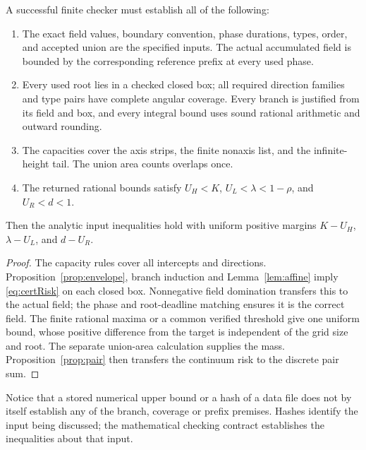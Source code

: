 \begin{proposition}\label{prop:contract}
A successful finite checker must establish all of the following:
\begin{enumerate}
\item The exact field values, boundary convention, phase durations,
types, order, and accepted union are the specified inputs.
The actual accumulated field is bounded by the corresponding
reference prefix at every used phase.
\item Every used root lies in a checked closed box; all required
direction families and type pairs have complete angular coverage.
Every branch is justified from its field and box, and every integral
bound uses sound rational arithmetic and outward rounding.
\item The capacities cover the axis strips, the finite nonaxis list,
and the infinite-height tail. The union area counts overlaps once.
\item The returned rational bounds satisfy
\(U_H<K\), \(U_L<\lambda<1-\rho\), and \(U_R<d<1\).
\end{enumerate}
Then the analytic input inequalities hold with uniform positive
margins \(K-U_H\), \(\lambda-U_L\), and \(d-U_R\).
\end{proposition}
\begin{proof}
The capacity rules cover all intercepts and directions.
Proposition~\ref{prop:envelope}, branch induction and
Lemma~\ref{lem:affine} imply \eqref{eq:certRisk} on each closed box.
Nonnegative field domination transfers this to the actual field;
the phase and root-deadline matching ensures it is the correct
field. The finite rational maxima or a common verified threshold
give one uniform bound, whose positive difference from the target
is independent of the grid size and root. The separate union-area
calculation supplies the mass. Proposition~\ref{prop:pair} then
transfers the continuum risk to the discrete pair sum.
\end{proof}

Notice that a stored numerical upper bound or a hash of a data file
does not by itself establish any of the branch, coverage or prefix
premises. Hashes identify the input being discussed; the mathematical
checking contract establishes the inequalities about that input.

